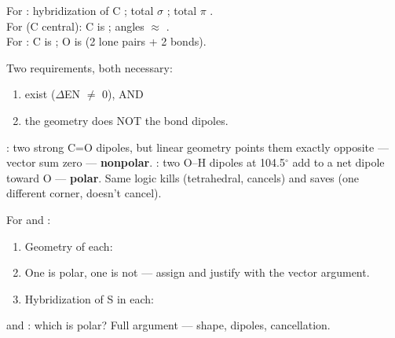 \documentclass{apchem-notes}
\begin{document}
For : hybridization of C ; total $\sigma$
; total $\pi$ .\\
For  (C central): C is ; angles
$\approx$ .\\
For : C is ; O is
 (2 lone pairs + 2 bonds).



Two requirements, both necessary:
\begin{enumerate}[leftmargin=*,itemsep=0.2em]
  \item {} exist ($\Delta$EN $\ne$ 0), AND
  \item the geometry does NOT  the bond dipoles.
\end{enumerate}

\begin{workedexample}
: two strong C=O dipoles, but linear geometry points them exactly
opposite --- vector sum zero --- \textbf{nonpolar}. : two O--H
dipoles at 104.5$^\circ$ add to a net dipole toward O --- \textbf{polar}.
Same logic kills  (tetrahedral, cancels) and saves 
(one different corner, doesn't cancel).
\end{workedexample}


For  and :
\begin{enumerate}[leftmargin=*,itemsep=0.4em]
  \item Geometry of each: 
  \item One is polar, one is not --- assign and justify with the vector
        argument. 
  \item Hybridization of S in each: 
\end{enumerate}

\begin{exitticket}
 and : which is polar? Full argument --- shape, dipoles,
cancellation. 
\end{exitticket}
\end{document}
